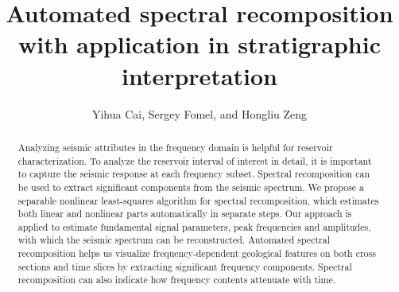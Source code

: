 
%
\title{Automated spectral recomposition with application in stratigraphic interpretation}

\renewcommand{\thefootnote}{\fnsymbol{footnote}}

\author{Yihua Cai\footnotemark[1]\footnotemark[2], Sergey Fomel\footnotemark[2], and Hongliu Zeng\footnotemark[2]}

\address{
\footnotemark[1]Currently Shell EPCO\\
200 N Dairy Ashford Rd\\
Houston, TX 77079-1101\\
\footnotemark[2]Bureau of Economic Geology\\
Jackson School of Geosciences\\
The University of Texas at Austin \\
Austin, TX 78713-8924}


\maketitle
\begin{abstract}
Analyzing seismic attributes in the frequency domain is helpful for reservoir characterization. To analyze the reservoir interval of interest in detail, it is important to capture the seismic response at each frequency subset. Spectral recomposition can be used to extract significant components from the seismic spectrum. We propose a separable nonlinear least-squares algorithm for spectral recomposition, which estimates both linear and nonlinear parts automatically in separate steps. Our approach is applied to estimate fundamental signal parameters, peak frequencies and amplitudes, with which the seismic spectrum can be reconstructed. Automated spectral recomposition helps us visualize frequency-dependent geological features on both cross sections and time slices by extracting significant frequency components. Spectral recomposition can also indicate how frequency contents attenuate with time.
\end{abstract}
